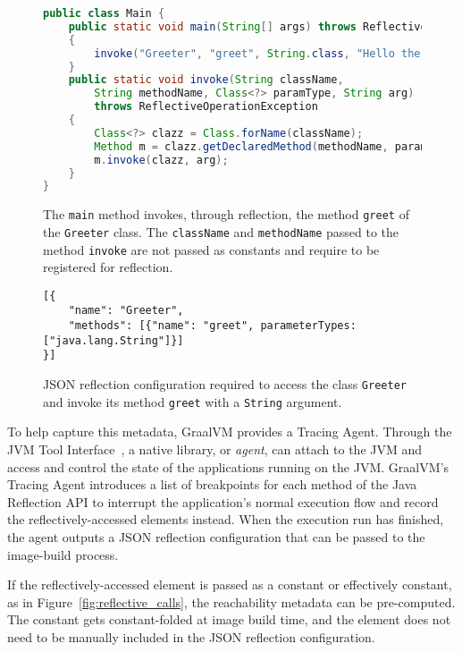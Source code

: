 \begin{figure}[ht]
    \centering
\begin{lstlisting}[language=Java]
public class Main {
    public static void main(String[] args) throws ReflectiveOperationException 
    {
        invoke("Greeter", "greet", String.class, "Hello there!");
    }   
    public static void invoke(String className, 
        String methodName, Class<?> paramType, String arg) 
        throws ReflectiveOperationException 
    {
        Class<?> clazz = Class.forName(className);
        Method m = clazz.getDeclaredMethod(methodName, paramType);
        m.invoke(clazz, arg);
    }
}
\end{lstlisting}
    \caption{The \texttt{main} method invokes, through reflection, the method \texttt{greet} of the \texttt{Greeter} class. The \texttt{className} and \texttt{methodName} passed to the method \texttt{invoke} are not passed as constants and require to be registered for reflection.}
    \label{fig:reflective_calls_invoke}
\end{figure}

\begin{figure}[ht]
    \centering
\begin{lstlisting}
[{
    "name": "Greeter",
    "methods": [{"name": "greet", parameterTypes: ["java.lang.String"]}]
}]    
\end{lstlisting}
    \caption{JSON reflection configuration required to access the class \texttt{Greeter} and invoke its method \texttt{greet} with a \texttt{String} argument.}
    \label{fig:reflect_config}
\end{figure}

To help capture this metadata, GraalVM provides a Tracing Agent. Through the JVM Tool Interface~\cite{noauthor_jvmtm_nodate}, a native library, or \emph{agent}, can attach to the JVM and access and control the state of the applications running on the JVM. GraalVM's Tracing Agent introduces a list of breakpoints for each method of the Java Reflection API to interrupt the application's normal execution flow and record the reflectively-accessed elements instead. When the execution run has finished, the agent outputs a JSON reflection configuration that can be passed to the image-build process.

If the reflectively-accessed element is passed as a constant or effectively constant, as in Figure~\ref{fig:reflective_calls}, the reachability metadata can be pre-computed. The constant gets constant-folded at image build time, and the element does not need to be manually included in the JSON reflection configuration.

